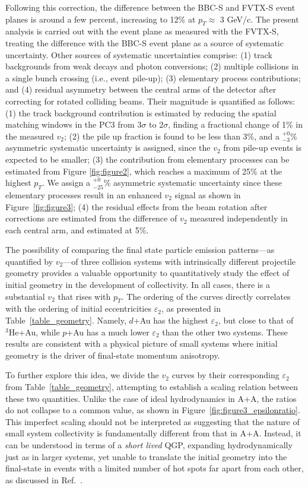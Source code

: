 \documentclass[%
reprint,
showpacs,preprintnumbers,
 amsmath,amssymb,
 aps,
]{revtex4-1}
\newcommand{\pt}{\mbox{$p_T$}\xspace}
\newcommand{\dau}{\mbox{$d$+Au}\xspace}
\newcommand{\pau}{\mbox{$p$+Au}\xspace}
\newcommand{\hau}{\mbox{$^3\text{He}$+Au}\xspace}
\begin{document}
Following this correction, the difference between the BBC-S and FVTX-S event planes is around a few percent, increasing to 12\% at $p_T\approx$ 3 GeV/c. The present analysis is carried out with the event plane as measured with the FVTX-S, treating the difference with the BBC-S event plane as a source of systematic uncertainty. Other sources of systematic uncertainties comprise: (1) track backgrounds from weak decays and photon conversions; (2) multiple collisions in a single bunch crossing (i.e., event pile-up); (3) elementary process contributions; and (4) residual asymmetry between the central arms of the detector after correcting for rotated colliding beams. Their magnitude is quantified as follows: (1) the track background contribution is estimated by reducing the spatial matching windows in the PC3 from $3\sigma$ to $2\sigma$, finding a fractional change of 1\% in the measured $v_{2}$; (2) the pile up fraction is found to be less than 3\%, and a $^{+0}_{-3}\%$ asymmetric systematic uncertainty is assigned, since the $v_{2}$ from pile-up events is expected to be smaller; (3) the contribution from elementary processes can be estimated from Figure \ref{fig:figure2}, which reaches a maximum of 25\% at the highest $p_T$. We assign a $^{+0}_{-25}\%$ asymmetric systematic uncertainty since these elementary processes result in an enhanced $v_2$ signal as shown in Figure~\ref{fig:figure3}; (4) the residual effects from the beam rotation after corrections are estimated from the difference of $v_2$ measured independently in each central arm, and estimated at 5\%.

The possibility of comparing the final state particle emission patterns---as quantified by $v_2$---of three collision systems with intrinsically different projectile geometry provides a valuable opportunity to quantitatively study the effect of initial geometry in the development of collectivity.  In all cases, there is a substantial $v_2$ that rises with \pt. The ordering of the curves directly correlates with the ordering of initial eccentricities $\varepsilon_2$, as presented in Table~\ref{table_geometry}. Namely, \dau has the highest $\varepsilon_2$, but close to that of \hau, while \pau has a much lower $\varepsilon_2$ than the other two systems. These results are consistent with a physical picture of small systems where initial geometry is the driver of final-state momentum anisotropy.

To further explore this idea, we divide the $v_2$ curves by their corresponding $\varepsilon_2$ from Table~\ref{table_geometry}, attempting to establish a scaling relation between these two quantities. Unlike the case of ideal hydrodynamics in A+A, the ratios do not collapse to a common value, as shown in Figure~\ref{fig:figure3_epsilonratio}. This imperfect scaling should not be interpreted as suggesting that the nature of small system collectivity is fundamentally different from that in A+A. Instead, it can be understood in terms of a \emph{short lived} QGP, expanding hydrodynamically just as in larger systems, yet unable to translate the initial geometry into the final-state in events with a limited number of hot spots far apart from each other, as discussed in Ref.~\cite{nagle_exploiting_2013}.
\end{document}
